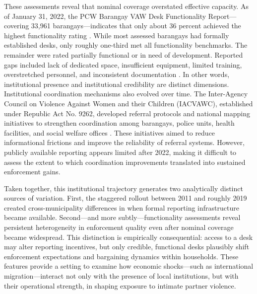 \documentclass[12pt]{article}
\begin{document}
These assessments reveal that nominal coverage overstated effective capacity. As of January 31, 2022, the PCW Barangay VAW Desk Functionality Report—covering 33,961 barangays—indicates that only about 36 percent achieved the highest functionality rating \citep{pcw_functionality_2022}. While most assessed barangays had formally established desks, only roughly one-third met all functionality benchmarks. The remainder were rated partially functional or in need of development. Reported gaps included lack of dedicated space, insufficient equipment, limited training, overstretched personnel, and inconsistent documentation \citep{pcw_functionality_2022}. In other words, institutional presence and institutional credibility are distinct dimensions.
Institutional coordination mechanisms also evolved over time. The Inter-Agency Council on Violence Against Women and their Children (IACVAWC), established under Republic Act No. 9262, developed referral protocols and national mapping initiatives to strengthen coordination among barangays, police units, health facilities, and social welfare offices \citep{ra9262, iacvawc_mapping}. These initiatives aimed to reduce informational frictions and improve the reliability of referral systems. However, publicly available reporting appears limited after 2022, making it difficult to assess the extent to which coordination improvements translated into sustained enforcement gains.

Taken together, this institutional trajectory generates two analytically distinct sources of variation. First, the staggered rollout between 2011 and roughly 2019 created cross-municipality differences in when formal reporting infrastructure became available. Second—and more subtly—functionality assessments reveal persistent heterogeneity in enforcement quality even after nominal coverage became widespread. This distinction is empirically consequential: access to a desk may alter reporting incentives, but only credible, functional desks plausibly shift enforcement expectations and bargaining dynamics within households. These features provide a setting to examine how economic shocks—such as international migration—interact not only with the presence of local institutions, but with their operational strength, in shaping exposure to intimate partner violence.
\end{document}
